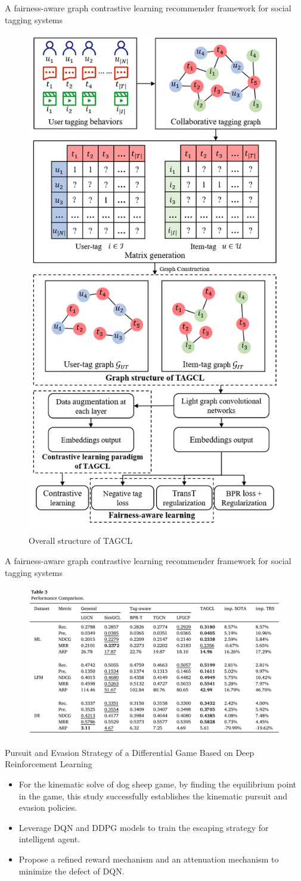 \documentclass{beamer}
\begin{document}
\begin{frame}{A fairness-aware graph contrastive learning recommender framework for social tagging systems}
    \begin{figure}[H]
        \centering
        \includegraphics[width=0.28\linewidth]{figure/tagcl.png}
        \caption{Overall structure of TAGCL}
    \end{figure}
\end{frame}

\begin{frame}{A fairness-aware graph contrastive learning recommender framework for social tagging systems}
    \begin{figure}[H]
        \centering
        \includegraphics[width=\linewidth]{figure/tagcl_performance.png}
    \end{figure}
\end{frame}

\begin{frame}{Pursuit and Evasion Strategy of a Differential Game Based on Deep Reinforcement Learning}
    \begin{itemize}
        \item For the kinematic solve of dog sheep game, by finding the equilibrium point in the game, this study successfully establishes the kinematic pursuit and evasion policies.
        \item Leverage DQN and DDPG models to train the escaping strategy for intelligent agent.
        \item Propose a refined reward mechanism and an attenuation mechanism to minimize the defect of DQN.
    \end{itemize}
\end{frame}
\end{document}
